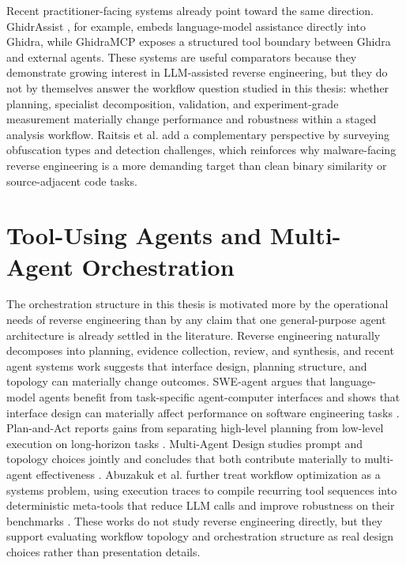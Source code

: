 Recent practitioner-facing systems already point toward the same direction. GhidrAssist \cite{ghidrassist2025}, for example, embeds language-model assistance directly into Ghidra, while GhidraMCP \cite{ghidramcp2025} exposes a structured tool boundary between Ghidra and external agents. These systems are useful comparators because they demonstrate growing interest in LLM-assisted reverse engineering, but they do not by themselves answer the workflow question studied in this thesis: whether planning, specialist decomposition, validation, and experiment-grade measurement materially change performance and robustness within a staged analysis workflow. Raitsis et al. \cite{raitsis2025obfuscation} add a complementary perspective by surveying obfuscation types and detection challenges, which reinforces why malware-facing reverse engineering is a more demanding target than clean binary similarity or source-adjacent code tasks.

\section{Tool-Using Agents and Multi-Agent Orchestration}

The orchestration structure in this thesis is motivated more by the operational needs of reverse engineering than by any claim that one general-purpose agent architecture is already settled in the literature. Reverse engineering naturally decomposes into planning, evidence collection, review, and synthesis, and recent agent systems work suggests that interface design, planning structure, and topology can materially change outcomes. SWE-agent argues that language-model agents benefit from task-specific agent-computer interfaces and shows that interface design can materially affect performance on software engineering tasks \cite{yang2024sweagentagentcomputerinterfacesenable}. Plan-and-Act reports gains from separating high-level planning from low-level execution on long-horizon tasks \cite{erdogan2025planandactimprovingplanningagents}. Multi-Agent Design studies prompt and topology choices jointly and concludes that both contribute materially to multi-agent effectiveness \cite{zhou2026multiagentdesignoptimizingagents}. Abuzakuk et al. further treat workflow optimization as a systems problem, using execution traces to compile recurring tool sequences into deterministic meta-tools that reduce LLM calls and improve robustness on their benchmarks \cite{abuzakuk2026optimizingagenticworkflowsusing}. These works do not study reverse engineering directly, but they support evaluating workflow topology and orchestration structure as real design choices rather than presentation details.

